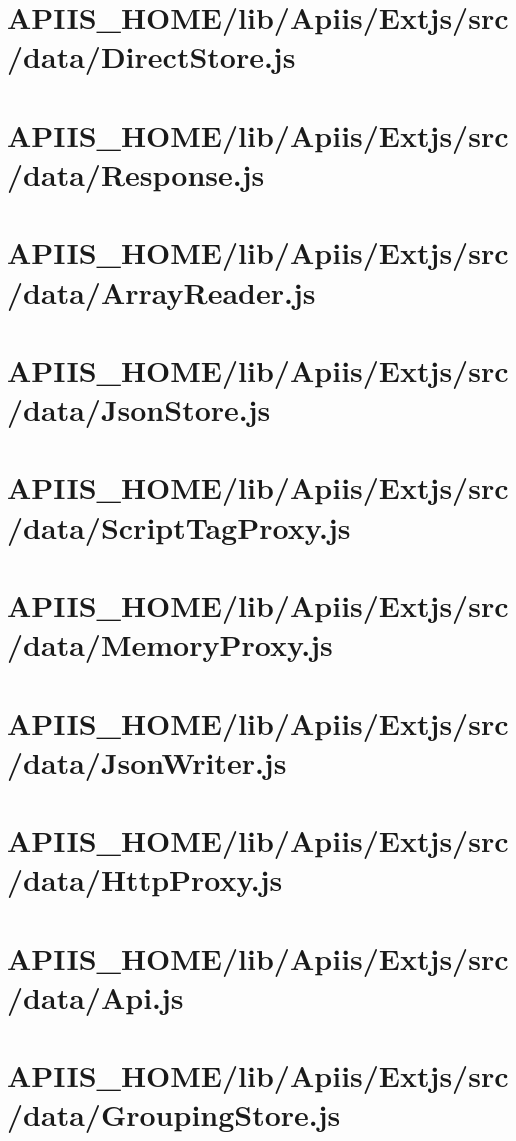 \section{APIIS\_HOME/lib/Apiis/Extjs/src/data/DirectStore.js} 
\section{APIIS\_HOME/lib/Apiis/Extjs/src/data/Response.js} 
\section{APIIS\_HOME/lib/Apiis/Extjs/src/data/ArrayReader.js} 
\section{APIIS\_HOME/lib/Apiis/Extjs/src/data/JsonStore.js} 
\section{APIIS\_HOME/lib/Apiis/Extjs/src/data/ScriptTagProxy.js} 
\section{APIIS\_HOME/lib/Apiis/Extjs/src/data/MemoryProxy.js} 
\section{APIIS\_HOME/lib/Apiis/Extjs/src/data/JsonWriter.js} 
\section{APIIS\_HOME/lib/Apiis/Extjs/src/data/HttpProxy.js} 
\section{APIIS\_HOME/lib/Apiis/Extjs/src/data/Api.js} 
\section{APIIS\_HOME/lib/Apiis/Extjs/src/data/GroupingStore.js} 
